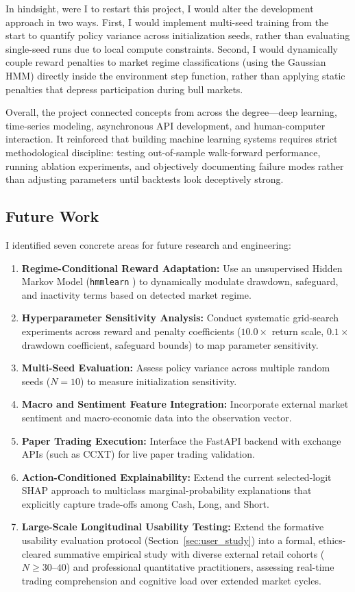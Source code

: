 \documentclass[11pt,a4paper]{article}
\begin{document}
In hindsight, were I to restart this project, I would alter the development approach in two ways. First, I would implement multi-seed training from the start to quantify policy variance across initialization seeds, rather than evaluating single-seed runs due to local compute constraints. Second, I would dynamically couple reward penalties to market regime classifications (using the Gaussian HMM) directly inside the environment step function, rather than applying static penalties that depress participation during bull markets.

Overall, the project connected concepts from across the degree---deep learning, time-series modeling, asynchronous API development, and human-computer interaction. It reinforced that building machine learning systems requires strict methodological discipline: testing out-of-sample walk-forward performance, running ablation experiments, and objectively documenting failure modes rather than adjusting parameters until backtests look deceptively strong.

\subsection{Future Work}
I identified seven concrete areas for future research and engineering:
\begin{enumerate}[leftmargin=2em, itemsep=2pt, parsep=0pt]
    \item \textbf{Regime-Conditional Reward Adaptation:} Use an unsupervised Hidden Markov Model (\texttt{hmmlearn} \cite{hamilton1989,rabiner1989}) to dynamically modulate drawdown, safeguard, and inactivity terms based on detected market regime.
    \item \textbf{Hyperparameter Sensitivity Analysis:} Conduct systematic grid-search experiments across reward and penalty coefficients ($10.0\times$ return scale, $0.1\times$ drawdown coefficient, safeguard bounds) to map parameter sensitivity.
    \item \textbf{Multi-Seed Evaluation:} Assess policy variance across multiple random seeds ($N=10$) to measure initialization sensitivity.
    \item \textbf{Macro and Sentiment Feature Integration:} Incorporate external market sentiment and macro-economic data into the observation vector.
    \item \textbf{Paper Trading Execution:} Interface the FastAPI backend with exchange APIs (such as CCXT) for live paper trading validation.
    \item \textbf{Action-Conditioned Explainability:} Extend the current selected-logit SHAP approach to multiclass marginal-probability explanations that explicitly capture trade-offs among Cash, Long, and Short.
    \item \textbf{Large-Scale Longitudinal Usability Testing:} Extend the formative usability evaluation protocol (Section~\ref{sec:user_study}) into a formal, ethics-cleared summative empirical study with diverse external retail cohorts ($N \ge 30\text{--}40$) and professional quantitative practitioners, assessing real-time trading comprehension and cognitive load over extended market cycles.
\end{enumerate}
\end{document}
